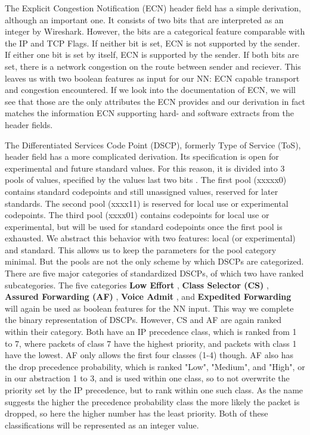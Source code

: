 \documentclass[
	ngerman,
	ruledheaders=section,%
	class=report,%
	thesis={type=bachelor},%
	accentcolor=9c,%
	custommargins=true,%
	marginpar=false,%
	parskip=half-,%
	fontsize=11pt,%
]{tudapub}
\begin{document}
The Explicit Congestion Notification (ECN) \cite{floydAdditionExplicitCongestion} header field has a simple derivation, although an important one.
It consists of two bits that are interpreted as an integer by Wireshark.
However, the bits are a categorical feature comparable with the IP and TCP Flags.
If neither bit is set, ECN is not supported by the sender.
If either one bit is set by itself, ECN is supported by the sender.
If both bits are set, there is a network congestion on the route between sender and reciever.
This leaves us with two boolean features as input for our NN: ECN capable transport and congestion encountered.
If we look into the documentation of ECN, we will see that those are the only attributes the ECN provides \cite{DifferentiatedServicesField} and our derivation in fact matches the information ECN supporting hard- and software extracts from the header fields.

The Differentiated Services Code Point (DSCP), formerly Type of Service (ToS), header field has a more complicated derivation.
Its specification is open for experimental and future standard values.
For this reason, it is divided into 3 pools of values, specified by the values last two bits \cite{DifferentiatedServicesField}.
The first pool (xxxxx0) contains standard codepoints and still unassigned values, reserved for later standards.
The second pool (xxxx11) is reserved for local use or experimental codepoints.
The third pool (xxxx01) contains codepoints for local use or experimental, but will be used for standard codepoints once the first pool is exhausted.
We abstract this behavior with two features: local (or experimental) and standard.
This allows us to keep the parameters for the pool category minimal.
But the pools are not the only scheme by which DSCPs are categorized.
There are five major categories of standardized DSCPs, of which two have ranked subcategories.
The five categories \textbf{Low Effort} \cite{blessLowerEffortPerHopBehavior}, \textbf{Class Selector (CS)} \cite{nicholsDefinitionDifferentiatedServices}, \textbf{Assured Forwarding (AF)} \cite{wroclawskiAssuredForwardingPHB}, \textbf{Voice Admit} \cite{bakerDifferentiatedServicesCode}, and \textbf{Expedited Forwarding} \cite{firoiuExpeditedForwardingPHB} will again be used as boolean features for the NN input.
This way we complete the binary representation of DSCPs.
However, CS and AF are again ranked within their category.
Both have an IP precedence class, which is ranked from 1 to 7, where packets of class 7 have the highest priority, and packets with class 1 have the lowest.
AF only allows the first four classes (1-4) though.
AF also has the drop precedence probability, which is ranked "Low", "Medium", and "High", or in our abstraction 1 to 3, and is used within one class, so to not overwrite the priority set by the IP precedence, but to rank within one such class.
As the name suggests the higher the precedence probability class the more likely the packet is dropped, so here the higher number has the least priority.
Both of these classifications will be represented as an integer value.
\end{document}
